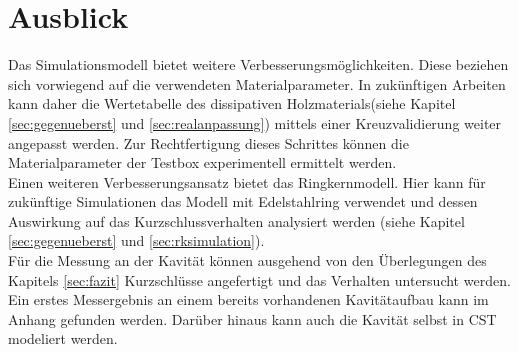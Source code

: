 \section{Ausblick}
Das Simulationsmodell bietet weitere Verbesserungsm\"oglichkeiten. Diese beziehen sich vorwiegend auf die verwendeten Materialparameter.
In zuk\"unftigen Arbeiten kann daher die Wertetabelle des dissipativen Holzmaterials(siehe Kapitel \ref{sec:gegenueberst} und \ref{sec:realanpassung}) mittels einer Kreuzvalidierung weiter angepasst werden. Zur Rechtfertigung dieses Schrittes k\"onnen die Materialparameter der Testbox experimentell ermittelt werden.\\
Einen weiteren Verbesserungsansatz bietet das Ringkernmodell. Hier kann f\"ur zuk\"unftige Simulationen das Modell mit Edelstahlring verwendet und dessen Auswirkung auf das Kurzschlussverhalten analysiert werden (siehe Kapitel \ref{sec:gegenueberst} und \ref{sec:rksimulation}).\\
F\"ur die Messung an der Kavit\"at k\"onnen ausgehend von den \"Uberlegungen des Kapitels \ref{sec:fazit} Kurzschl\"usse angefertigt und das Verhalten untersucht werden. Ein erstes Messergebnis an einem bereits vorhandenen Kavit\"ataufbau kann im Anhang gefunden werden. Dar\"uber hinaus kann auch die Kavit\"at selbst in CST modeliert werden.
